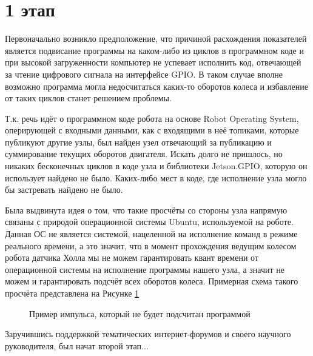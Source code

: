 \documentclass[12pt,a4paper]{scrartcl}
\begin{document}
		\section*{1 этап}
			Первоначально возникло предположение, что причиной расхождения показателей является подвисание программы на каком-либо из циклов в программном коде и при высокой загруженности компьютер не успевает исполнить код, отвечающей за чтение цифрового сигнала на интерфейсе GPIO. В таком случае вполне возможно программа могла недосчитаться каких-то оборотов колеса и избавление от таких циклов станет решением проблемы.
			
			Т.к. речь идёт о программном коде робота на основе Robot Operating System, оперирующей с входными данными, как с входящими в неё топиками, которые публикуют другие узлы, был найден узел отвечающий за публикацию и суммирование текущих оборотов двигателя. Искать долго не пришлось, но никаких бесконечных циклов в коде узла и библиотеки Jetson.GPIO, которую он использует найдено не было. Каких-либо мест в коде, где исполнение узла могло бы застревать найдено не было. 
			
			Была выдвинута идея о том, что такие просчёты со стороны узла напрямую связаны с природой операционной системы Ubuntu, используемой на роботе. Данная ОС не является системой, нацеленной на исполнение команд в режиме реального времени, а это значит, что в момент прохождения ведущим колесом робота датчика Холла мы не можем гарантировать квант времени от операционной системы на исполнение программы нашего узла, а значит не можем и гарантировать подсчёт всех оборотов колеса. Примерная схема такого просчёта представлена на Рисунке \ref{fig:Miscount}
			
			\begin{figure}[h]
				\caption{Пример импульса, который не будет подсчитан программой}
				\label{fig:Miscount}
			\end{figure}
			
			Заручившись поддержкой тематических интернет-форумов и своего научного руководителя, был начат второй этап...
			
\end{document}
